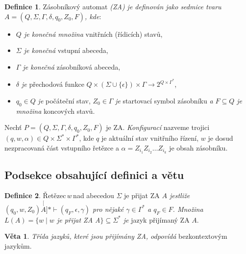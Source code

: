 \documentclass[hidelinks, 11pt, a4paper, twocolumn]{article}
\theoremstyle{definition}
\newtheorem{definice}{Definice}
\theoremstyle{definition}
\newtheorem{veta}{Věta}
\begin{document}
\begin{definice}
\label{definice1}
Zásobníkový automat
 \emph{(ZA) je definován jako sedmice tvaru $A=(Q, \Sigma, \Gamma, \delta, q_{0}, Z_{0}, F) $, kde}:
 \begin{itemize}
  \item \emph{$Q$ je konečná množina} vnitřních (řídicích) stavů,
   \item \emph{$\Sigma$ je konečná} vstupní abeceda,
   \item \emph{$\Gamma$ je konečná} zásobníková abeceda,
   \item \emph{$\delta$ je} přechodová funkce $Q \times (\Sigma \cup \{\epsilon\}) \times \Gamma \to 2^{Q \times \Gamma^\ast} $,
   \item $q_{0} \in Q$ \emph{je} počáteční stav, $Z_{0} \in \Gamma$ \emph{je} startovací symbol zásobníku \emph{a $F \subseteq Q$ je množina} koncových
     stavů.
\end{itemize}

    Nechť $P=(Q, \Sigma, \Gamma, \delta, q_{0}, Z_{0}, F)$ je ZA. \emph{Konfigurací} nazveme trojici $(q,w,\alpha) \in Q \times \Sigma^\ast \times \Gamma^\ast$,
     kde $q$ je aktuální stav vnitřního řízení, $w$ je dosud nezpracovaná část
      vstupního řetězce a $\alpha = Z_{i_1}Z_{i_2} \dots Z_{i_k}$ je obsah zásobníku.

\end{definice}

\subsection{Podsekce obsahující definici a větu}

\label{definice2}
\begin{definice}
Řetězec\,$w$\,nad abecedou $\Sigma$ je přijat ZA \emph{$A$ jestliže $(q_0, w, Z_0)\stackrel[A]{\ast}{\vdash}(q_F, \epsilon, \gamma) $ pro nějaké $\gamma \in \Gamma^\ast$ a $q_F \in F$. Množina $L(A) = \{w \mid w$ je přijat ZA A$\} \subseteq \Sigma^\ast$ je} jazyk přijímaný ZA $A$.
\end{definice}

\label{veta1}
\begin{veta}
\emph{Třída jazyků, které jsou přijímány ZA, odpovídá} bezkontextovým jazykům.
\end{veta}
\end{document}
